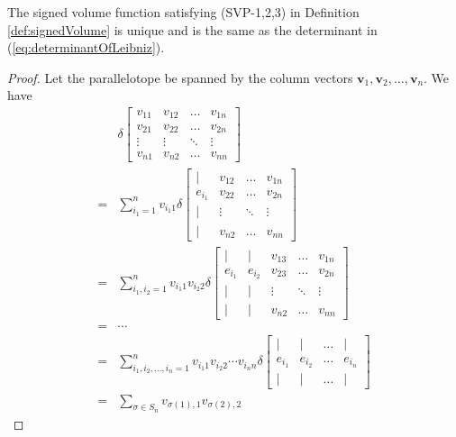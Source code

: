\begin{thm}
  The signed volume function satisfying (SVP-1,2,3)
  in Definition \ref{def:signedVolume} is unique
  and is the same as the determinant
  in (\ref{eq:determinantOfLeibniz}).
\end{thm}
\begin{proof}
  Let the parallelotope be spanned by the column vectors
  $\mathbf{v}_1, \mathbf{v}_{2},\ldots, \mathbf{v}_n$.
  We have
  \begin{align*}
    & \delta
    \begin{bmatrix}
      v_{11} & v_{12} & \ldots & v_{1n}
      \\
      v_{21} & v_{22} & \ldots & v_{2n}
      \\
      \vdots & \vdots & \ddots & \vdots
      \\
      v_{n1} & v_{n2} & \ldots & v_{nn}
    \end{bmatrix}
    \\
    =& \sum_{i_1=1}^n v_{i_1 1}
    \delta
    \begin{bmatrix}
      | & v_{12} & \ldots & v_{1n}
      \\
      e_{i_1} & v_{22} & \ldots & v_{2n}
      \\
      | & \vdots & \ddots & \vdots
      \\
      | & v_{n2} & \ldots & v_{nn}
    \end{bmatrix}
    \\
    =& \sum_{i_1,i_2=1}^n v_{i_1 1}v_{i_2 2}
    \delta
    \begin{bmatrix}
      | & | & v_{13} & \ldots & v_{1n}
      \\
      e_{i_1} & e_{i_2} & v_{23} & \ldots & v_{2n}
      \\
      | & | & \vdots & \ddots & \vdots
      \\
      | & | & v_{n2} & \ldots & v_{nn}
    \end{bmatrix}
    \\
    =& \cdots
    \\
    =& \sum_{i_1,i_2, \ldots, i_n=1}^n v_{i_1 1}v_{i_2 2}
       \cdots v_{i_n n}
    \delta
    \begin{bmatrix}
      | & | & \ldots & |
      \\
      e_{i_1} & e_{i_2} & \ldots & e_{i_n}
      \\
      | & | & \ldots & |
    \end{bmatrix}
    \\
    =& \sum_{\sigma\in S_n} v_{\sigma(1),1}v_{\sigma(2),2}

\end{align*}
\end{proof}
